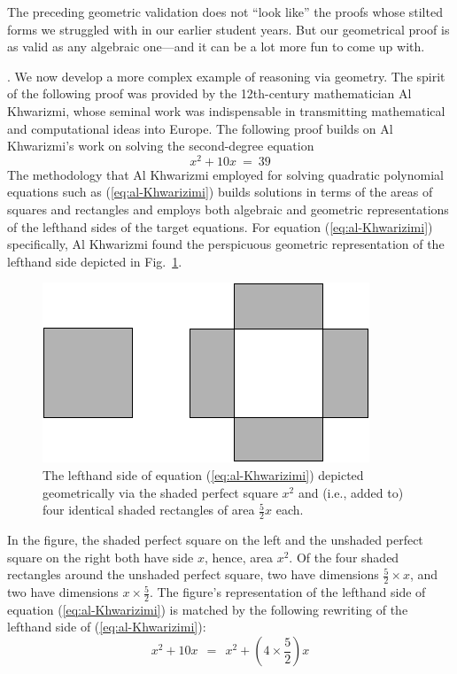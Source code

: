 \medskip

\noindent
The preceding geometric validation does not ``look like'' the proofs
whose stilted forms we struggled with in our earlier student years.
But our geometrical proof is as valid as any algebraic one---and it
can be a lot more fun to come up with.

\bigskip

.  We now develop a more
complex example of reasoning via geometry.  The spirit of the
following proof was provided by the 12th-century mathematician Al
Khwarizmi,  whose
seminal work \cite{Al-Khwarizmi} was indispensable in transmitting
mathematical and computational ideas into Europe.  The following proof
builds on Al Khwarizmi's work on solving the second-degree equation
\begin{equation}
\label{eq:al-Khwarizimi}
x^2 + 10 x \ = \ 39
\end{equation}
The methodology that Al Khwarizmi employed for solving quadratic
polynomial equations such as (\ref{eq:al-Khwarizimi}) builds solutions
in terms of the areas of squares and rectangles and employs both
algebraic and geometric representations of the lefthand sides of the
target equations.  For equation (\ref{eq:al-Khwarizimi}) specifically,
Al Khwarizmi found the perspicuous geometric representation of the
lefthand side depicted in Fig.~\ref{fig:EqElKwarismi1}.
\begin{figure}[ht]
\begin{center}
       \includegraphics[scale=0.4]{FiguresArithmetic/EquationElKwarismi1}
\caption{The lefthand side of equation (\ref{eq:al-Khwarizimi})
  depicted geometrically via the shaded perfect square $x^2$ and (i.e., added
  to) four identical shaded rectangles of area $\frac{5}{2} x$ each.}
       \label{fig:EqElKwarismi1}
\end{center}
\end{figure}
In the figure, the shaded perfect square on the left and the unshaded
perfect square on the right both have side $x$, hence, area $x^2$.  Of
the four shaded rectangles around the unshaded perfect square, two
have dimensions $\frac{5}{2} \times x$, and two have dimensions $x
\times \frac{5}{2}$.  The figure's representation of the lefthand side
of equation (\ref{eq:al-Khwarizimi}) is matched by the following
rewriting of the lefthand side of (\ref{eq:al-Khwarizimi}):
\[ x^2 + 10 x \ \ = \ \ x^2 + \left( 4 \times \frac{5}{2} \right) x \]

